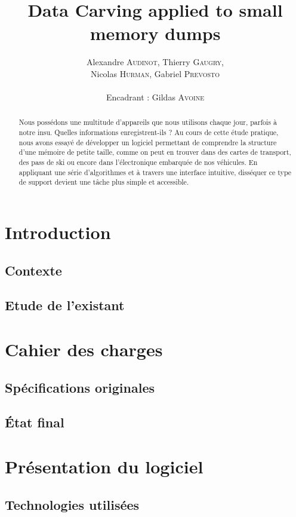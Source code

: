 \documentclass[a4paper,11pt]{article}
\title{ \textbf{Data Carving applied to small memory dumps} }
\author{Alexandre \textsc{Audinot}, Thierry \textsc{Gaugry}, \\
        Nicolas \textsc{Hurman}, Gabriel \textsc{Prevosto} \\
        \\
        Encadrant : Gildas \textsc{Avoine}}
\date{}                    %
\begin{document}
\maketitle                 %
\thispagestyle{empty}      %



\begin{abstract}
Nous possédons une multitude d'appareils que nous utilisons chaque jour, parfois à notre insu. Quelles informations enregistrent-ils ?
Au cours de cette étude pratique, nous avons essayé de développer un logiciel permettant de comprendre la structure d'une mémoire de petite taille, comme on peut en trouver dans des cartes de transport, des pass de ski ou encore dans l'électronique embarquée de nos véhicules. En appliquant une série d'algorithmes et à travers une interface intuitive, disséquer ce type de support devient une tâche plus simple et accessible.
\end{abstract}

\section{Introduction}
  \subsection{Contexte}
  \subsection{Etude de l'existant}
\section{Cahier des charges}
  \subsection{Spécifications originales}
  \subsection{État final}
\section{Présentation du logiciel}
  \subsection{Technologies utilisées}
\end{document}
